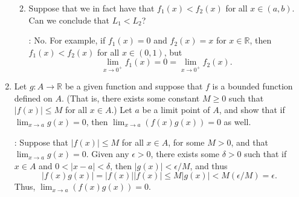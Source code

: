\documentclass[letterpaper,12pt]{article}
\newcommand{\R}{\mathbb{R}}
\newcommand{\abs}[1]{\lvert #1\rvert}
\begin{document}
\begin{enumerate}
\begin{enumerate}
\bigskip

 \item Suppose that we in fact have that $f_1(x)<f_2(x)$ for all $x\in (a,b)$. Can we conclude that $L_1<L_2$?

\bigskip

: No. For example, if $f_1(x)=0$ and $f_2(x)=x$ for $x\in\R$, then $f_1(x)<f_2(x)$ for all $x\in (0,1)$, but \[\lim_{x\to 0^+}f_1(x)=0=\lim_{x\to 0^+}f_2(x).\]

\bigskip

\end{enumerate}
 \item Let $g:A\to \R$ be a given function and suppose that $f$ is a bounded function defined on $A$. (That is, there exists some constant $M\geq 0$ such that $\abs{f(x)}\leq M$ for all $x\in A$.) Let $a$ be a limit point of $A$, and show that if $\displaystyle \lim_{x\to a}g(x)=0$, then $\displaystyle \lim_{x\to a}(f(x)g(x))=0$ as well.

\bigskip

: Suppose that $\abs{f(x)}\leq M$ for all $x\in A$, for some $M>0$, and that $\lim_{x\to a}g(x)=0$. Given any $\epsilon>0$, there exists some $\delta>0$ such that if $x\in A$ and $0<\abs{x-a}<\delta$, then $\abs{g(x)}<\epsilon/M$, and thus
\[
 \abs{f(x)g(x)} = \abs{f(x)}\abs{f(x)}\leq M\abs{g(x)}<M(\epsilon/M)=\epsilon.
\]
Thus, $\lim_{x\to a}(f(x)g(x))=0$.





\end{enumerate}
\end{document}
